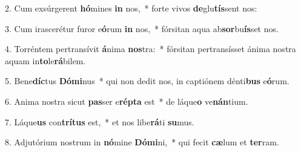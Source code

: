 2. Cum exsúrgerent \textbf{hó}mines \textbf{in} nos,~*  forte vivos \textbf{de}glu\textbf{tís}sent nos:\

3. Cum irascerétur furor e\textbf{ó}rum \textbf{in} nos,~*  fórsitan aqua ab\textbf{sor}bu\textbf{ís}set nos.\

4. Torréntem pertransívit \textbf{á}nima \textbf{nos}tra:~*  fórsitan pertransísset ánima nostra aquam in\textbf{to}le\textbf{rá}bilem.\

5. Bene\textbf{díc}tus \textbf{Dó}\textbf{mi}nus~*  qui non dedit nos, in captiónem dénti\textbf{bus} e\textbf{ó}rum.\

6. Anima nostra sicut \textbf{pas}ser e\textbf{rép}\textbf{ta} est~*  de láque\textbf{o} ve\textbf{nán}tium.\

7. Láque\textbf{us} con\textbf{trí}\textbf{tus} est,~*  et nos libe\textbf{rá}ti \textbf{su}mus.\

8. Adjutórium nostrum in \textbf{nó}mine \textbf{Dó}\textbf{mi}ni,~*  qui fecit \textbf{cæ}lum et \textbf{ter}ram.\

